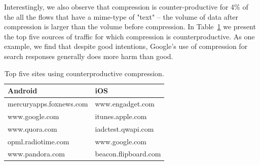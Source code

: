 Interestingly, we also observe that compression is counter-productive for 4\% of 
the all the flows that have a mime-type of "text" -- the volume of data after 
compression is larger than the volume before compression. In Table~\ref{tab:compression} we present the top five  
sources of traffic for which compression is counterproductive. As one example, we find 
that despite good intentions, Google's use of compression for search responses generally 
does more harm than good.

\begin{table}
\begin{center}
\begin{tabular}{|l|l|}
\hline
\textbf{Android} & \textbf{iOS} \tabularnewline
\hline
mercuryapps.foxnews.com & www.engadget.com \tabularnewline
\hline
www.google.com & itunes.apple.com \tabularnewline
\hline
www.quora.com & iadctest.qwapi.com \tabularnewline
\hline
opml.radiotime.com & www.google.com \tabularnewline
\hline
www.pandora.com & beacon.flipboard.com  \tabularnewline
\hline
\end{tabular}
\caption{Top five sites using counterproductive compression.}
\label{tab:compression}
\end{center}
\vspace{-1.5em}
\end{table}








 




